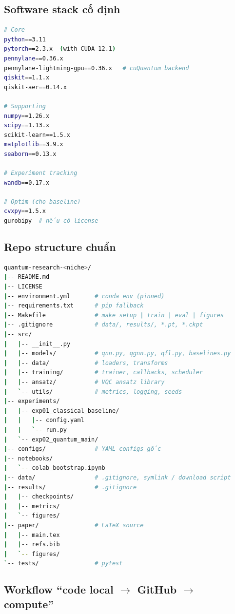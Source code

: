 \documentclass[11pt,a4paper]{article}
\begin{document}
\subsection{Software stack cố định}

\begin{lstlisting}[language=bash]
# Core
python==3.11
pytorch==2.3.x  (with CUDA 12.1)
pennylane==0.36.x
pennylane-lightning-gpu==0.36.x   # cuQuantum backend
qiskit==1.1.x
qiskit-aer==0.14.x

# Supporting
numpy==1.26.x
scipy==1.13.x
scikit-learn==1.5.x
matplotlib==3.9.x
seaborn==0.13.x

# Experiment tracking
wandb==0.17.x

# Optim (cho baseline)
cvxpy==1.5.x
gurobipy  # nếu có license
\end{lstlisting}

\subsection{Repo structure chuẩn}

\begin{lstlisting}[language=bash]
quantum-research-<niche>/
|-- README.md
|-- LICENSE
|-- environment.yml       # conda env (pinned)
|-- requirements.txt      # pip fallback
|-- Makefile              # make setup | train | eval | figures
|-- .gitignore            # data/, results/, *.pt, *.ckpt
|-- src/
|   |-- __init__.py
|   |-- models/           # qnn.py, qgnn.py, qfl.py, baselines.py
|   |-- data/             # loaders, transforms
|   |-- training/         # trainer, callbacks, scheduler
|   |-- ansatz/           # VQC ansatz library
|   `-- utils/            # metrics, logging, seeds
|-- experiments/
|   |-- exp01_classical_baseline/
|   |   |-- config.yaml
|   |   `-- run.py
|   `-- exp02_quantum_main/
|-- configs/              # YAML configs gốc
|-- notebooks/
|   `-- colab_bootstrap.ipynb
|-- data/                 # .gitignore, symlink / download script
|-- results/              # .gitignore
|   |-- checkpoints/
|   |-- metrics/
|   `-- figures/
|-- paper/                # LaTeX source
|   |-- main.tex
|   |-- refs.bib
|   `-- figures/
`-- tests/                # pytest
\end{lstlisting}

\subsection{Workflow ``code local $\rightarrow$ GitHub $\rightarrow$ compute''}
\end{document}

